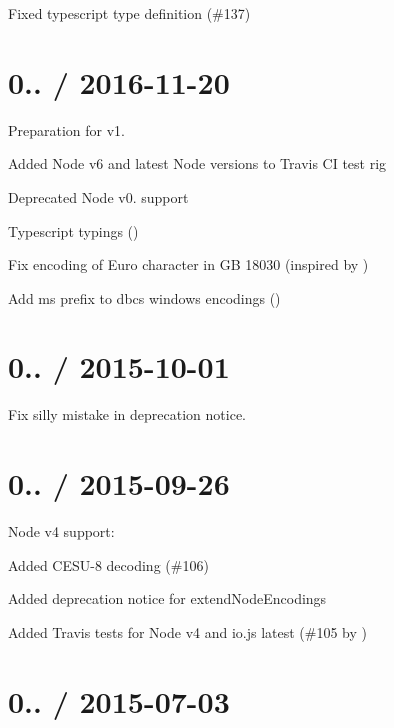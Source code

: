\begin{DoxyItemize}
\item Fixed typescript type definition (\#137)
\end{DoxyItemize}

\section*{0.. / 2016-\/11-\/20}


\begin{DoxyItemize}
\item Preparation for v1.
\item Added Node v6 and latest Node versions to Travis CI test rig
\item Deprecated Node v0. support
\item Typescript typings ()
\item Fix encoding of Euro character in GB 18030 (inspired by )
\item Add ms prefix to dbcs windows encodings ()
\end{DoxyItemize}

\section*{0.. / 2015-\/10-\/01}


\begin{DoxyItemize}
\item Fix silly mistake in deprecation notice.
\end{DoxyItemize}

\section*{0.. / 2015-\/09-\/26}


\begin{DoxyItemize}
\item Node v4 support\+:
\begin{DoxyItemize}
\item Added C\+E\+S\+U-\/8 decoding (\#106)
\item Added deprecation notice for {\ttfamily extend\+Node\+Encodings}
\item Added Travis tests for Node v4 and io.\+js latest (\#105 by )
\end{DoxyItemize}
\end{DoxyItemize}

\section*{0.. / 2015-\/07-\/03}


